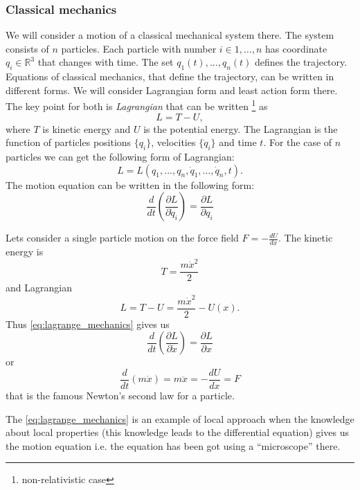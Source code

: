 \subsubsection{Classical mechanics}
We will consider a motion of a classical mechanical system there. The
system consists of $n$ particles. Each particle with number $i \in {1,
  \dots, n}$ has coordinate $q_i \in \mathbb{R}^3$ that changes with
time. The set ${q_1(t), \dots, q_n(t)}$ defines the trajectory.
Equations of classical mechanics, that define the trajectory, can be
written in different forms. We will 
consider Lagrangian form and least action form there. The key point
for both is \textit{Lagrangian} that can be
written \footnote{non-relativistic case} 
as 
\[
L = T - U,
\]
where $T$ is kinetic energy and $U$ is the potential energy. The
Lagrangian is the function of particles positions $\{q_i\}$,
velocities $\{\dot{q}_i\}$ and
time $t$. For the case of $n$ particles we can get the following form
of Lagrangian:
\[
L = L\left(q_1, \dots, q_n, \dot{q}_1, \dots, \dot{q}_n, t\right).
\]
The motion equation can be written in the following form:
\begin{equation}
\label{eq:lagrange_mechanics}
\frac{d}{dt}\left(
\frac{\partial L}{\partial \dot{q}_i} \right)
= \frac{\partial L}{\partial q_i}
\end{equation}
\begin{example}
Lets consider a single particle motion on the force field $F = -
\frac{d U}{d x}$.
The kinetic energy is
\[
T = \frac{m \dot{x}^2}{2}
\]
and Lagrangian
\[
L = T - U = \frac{m \dot{x}^2}{2} - U(x).
\]
Thus \eqref{eq:lagrange_mechanics} gives us
\[
\frac{d}{dt}\left(
\frac{\partial L}{\partial \dot{x}} \right)
= \frac{\partial L}{\partial x}
\]
or
\[
\frac{d}{dt}\left(m \dot{x}\right) = m \ddot{x} =
- \frac{d U}{d x} = F
\]
that is the famous Newton's second law for a particle. 
\end{example}

The \eqref{eq:lagrange_mechanics} is an example of local approach when
the knowledge about local properties (this knowledge leads to the
differential equation) gives us the motion equation i.e. the equation
has been got using a ``microscope'' there.

